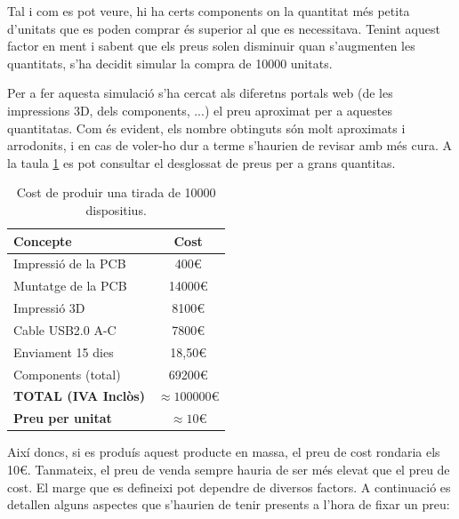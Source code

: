 Tal i com es pot veure, hi ha certs components on la quantitat més petita
d'unitats que es poden comprar és superior al que es necessitava. Tenint aquest
factor en ment i sabent que els preus solen disminuir quan s'augmenten les
quantitats, s'ha decidit simular la compra de 10000 unitats.

Per a fer aquesta simulació s'ha cercat als diferetns portals web (de les
impressions 3D, dels components, ...) el preu aproximat per a aquestes
quantitatas. Com és evident, els nombre obtinguts són molt aproximats i
arrodonits, i en cas de voler-ho dur a terme s'haurien de revisar amb més
cura. A la taula
\ref{tab:pricing10k} es pot consultar el desglossat de preus per a
grans quantitas.

\begin{table}[ht]
    \centering
    \begin{tabular}{lc}
        \textbf{Concepte}           & \textbf{Cost} \\ \hline
        Impressió de la PCB         & 400€          \\
        Muntatge de la PCB          & 14000€        \\
        Impressió 3D                & 8100€         \\
        Cable USB2.0 A-C            & 7800€         \\
        Enviament 15 dies           & 18,50€        \\
        Components (total)          & 69200€        \\ \hline
        \textbf{TOTAL (IVA Inclòs)} & \textbf{$\approx100000€$}  \\ \hline  
        \textbf{Preu per unitat}    & \textbf{$\approx10€$} 
        \end{tabular}
    \caption{Cost de produir una tirada de 10000 dispositius.}
    \label{tab:pricing10k}
\end{table}

Així doncs, si es produís aquest producte en massa, el preu de cost rondaria
els 10€. Tanmateix, el preu de venda sempre hauria de ser més elevat que
el preu de cost. El marge que es defineixi pot dependre de diversos factors.
A continuació es detallen alguns aspectes que s'haurien de tenir presents
a l'hora de fixar un preu:

